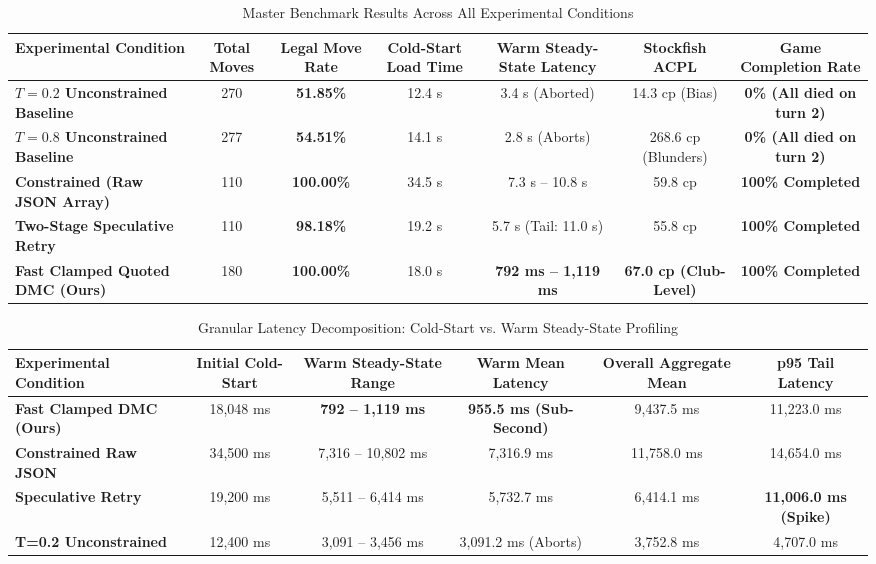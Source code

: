 \documentclass[conference]{IEEEtran}
\begin{document}
\begin{table}[t]
\caption{Master Benchmark Results Across All Experimental Conditions}
\label{tab:benchmark}
\centering
\begin{tabular}{lcccccc}
\toprule
\textbf{Experimental Condition} & \textbf{Total Moves} & \textbf{Legal Move Rate} & \textbf{Cold-Start Load Time} & \textbf{Warm Steady-State Latency} & \textbf{Stockfish ACPL} & \textbf{Game Completion Rate} \\
\midrule
\textbf{$T = 0.2$ Unconstrained Baseline} & 270 & \textbf{51.85\%} & 12.4 s & 3.4 s (Aborted) & 14.3 cp (Bias) & \textbf{0\% (All died on turn 2)} \\
\textbf{$T = 0.8$ Unconstrained Baseline} & 277 & \textbf{54.51\%} & 14.1 s & 2.8 s (Aborts) & 268.6 cp (Blunders) & \textbf{0\% (All died on turn 2)} \\
\textbf{Constrained (Raw JSON Array)} & 110 & \textbf{100.00\%} & 34.5 s & 7.3 s -- 10.8 s & 59.8 cp & \textbf{100\% Completed} \\
\textbf{Two-Stage Speculative Retry} & 110 & \textbf{98.18\%} & 19.2 s & 5.7 s (Tail: 11.0 s) & 55.8 cp & \textbf{100\% Completed} \\
\textbf{Fast Clamped Quoted DMC (Ours)} & 180 & \textbf{100.00\%} & 18.0 s & \textbf{792 ms -- 1,119 ms} & \textbf{67.0 cp (Club-Level)} & \textbf{100\% Completed} \\
\bottomrule
\end{tabular}
\end{table}

\begin{table}[t]
\caption{Granular Latency Decomposition: Cold-Start vs. Warm Steady-State Profiling}
\label{tab:latency_decomp}
\centering
\begin{tabular}{lccccc}
\toprule
\textbf{Experimental Condition} & \textbf{Initial Cold-Start} & \textbf{Warm Steady-State Range} & \textbf{Warm Mean Latency} & \textbf{Overall Aggregate Mean} & \textbf{p95 Tail Latency} \\
\midrule
\textbf{Fast Clamped DMC (Ours)} & 18,048 ms & \textbf{792 -- 1,119 ms} & \textbf{955.5 ms (Sub-Second)} & 9,437.5 ms & 11,223.0 ms \\
\textbf{Constrained Raw JSON} & 34,500 ms & 7,316 -- 10,802 ms & 7,316.9 ms & 11,758.0 ms & 14,654.0 ms \\
\textbf{Speculative Retry} & 19,200 ms & 5,511 -- 6,414 ms & 5,732.7 ms & 6,414.1 ms & \textbf{11,006.0 ms (Spike)} \\
\textbf{T=0.2 Unconstrained} & 12,400 ms & 3,091 -- 3,456 ms & 3,091.2 ms (Aborts) & 3,752.8 ms & 4,707.0 ms \\
\bottomrule
\end{tabular}
\end{table}
\end{document}
